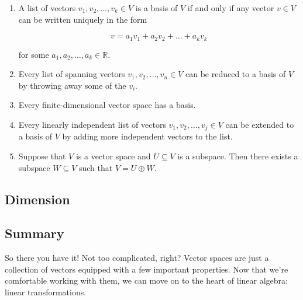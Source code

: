\documentclass[12pt]{article}
\begin{document}
\begin{enumerate}
\item A list of vectors $v_1, v_2, \ldots, v_k \in V$ is a basis of $V$ if and only if any vector $v \in V$ can be written uniquely in the form

$$v = a_1 v_1 + a_2 v_2 + \ldots + a_k v_k$$

for some $a_1, a_2, \ldots, a_k \in \mathbb{R}$.
\item Every list of spanning vectors $v_1, v_2, \ldots, v_n \in V$ can be reduced to a basis of $V$ by throwing away some of the $v_i$.

\item Every finite-dimensional vector space has a basis.

\item Every linearly independent list of vectors $v_1, v_2, \ldots, v_j \in V$ can be extended to a basis of $V$ by adding more independent vectors to the list.

\item Suppose that $V$ is a vector space and $U \subseteq V$ is a subspace. Then there exists a subspace $W \subseteq V$ such that $V = U \oplus W$.
\end{enumerate}

\subsection*{Dimension}


\subsection*{Summary}

So there you have it! Not too complicated, right? Vector spaces are just a collection of vectors equipped with a few important properties. Now that we're comfortable working with them, we can move on to the heart of linear algebra:  linear transformations.
\end{document}

